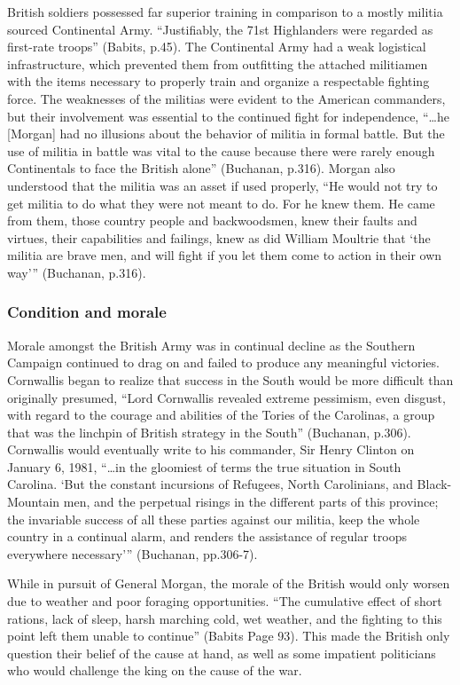 British soldiers possessed far superior training in comparison to a mostly
militia sourced Continental Army. “Justifiably, the 71st Highlanders were
regarded as first-rate troops” (Babits, p.45). The Continental Army had a weak
logistical infrastructure, which prevented them from outfitting the attached
militiamen with the items necessary to properly train and organize a respectable
fighting force.  The weaknesses of the militias were evident to the American
commanders, but their involvement was essential to the continued fight for
independence, “…he [Morgan] had no illusions about the behavior of militia in
formal battle.  But the use of militia in battle was vital to the cause because
there were rarely enough Continentals to face the British alone” (Buchanan,
p.316).  Morgan also understood that the militia was an asset if used properly,
“He would not try to get militia to do what they were not meant to do.  For he
knew them.  He came from them, those country people and backwoodsmen, knew their
faults and virtues, their capabilities and failings, knew as did William
Moultrie that ‘the militia are brave men, and will fight if you let them come to
action in their own way’” (Buchanan, p.316).  

\subsubsection{Condition and morale}

Morale amongst the British Army was in continual decline as the Southern
Campaign continued to drag on and failed to produce any meaningful victories.
Cornwallis began to realize that success in the South would be more difficult
than originally presumed, “Lord Cornwallis revealed extreme pessimism, even
disgust, with regard to the courage and abilities of the Tories of the
Carolinas, a group that was the linchpin of British strategy in the South”
(Buchanan, p.306).  Cornwallis would eventually write to his commander, Sir
Henry Clinton on January 6, 1981, “…in the gloomiest of terms the true situation
in South Carolina.  ‘But the constant incursions of Refugees, North Carolinians,
and Black-Mountain men, and the perpetual risings in the different parts of this
province; the invariable success of all these parties against our militia, keep
the whole country in a continual alarm, and renders the assistance of regular
troops everywhere necessary’” (Buchanan, pp.306-7). 

While in pursuit of General Morgan, the morale of the British would only worsen
due to weather and poor foraging opportunities. “The cumulative effect of short
rations, lack of sleep, harsh marching cold, wet weather, and the fighting to
this point left them unable to continue” (Babits Page 93).  This made the
British only question their belief of the cause at hand, as well as some
impatient politicians who would challenge the king on the cause of the war. 

